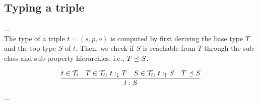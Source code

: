 \documentclass[runningheads]{llncs}
\newcommand{\darr}{\downarrow}
\newcommand{\uarr}{\uparrow}
\newcommand{\T}{{\cal T}}
\newcommand{\memo}[1]{}
\newcommand{\notes}[1]{\noindent\begin{small}-- \emph{#1}\hfill\break\end{small}}
\newcommand{\nnotes}[1]{\indent\begin{small}-- \emph{#1}\hfill\break\end{small}}
\begin{document}
\subsection{Typing a triple}

\memo{
\notes{Why using $\land$ and $\sqcap$ types for typing a triple $t$?}
\nnotes{We would like to check typing of a triple $t\in\T_i$.}
\nnotes{We compute first the ground type $T_g=\land[T_i^{i\in[1,n]}]$ and a stored type $T_s$ of $t$.}
\nnotes{The ground type $T_g$ is computed from the ground types of $t$'s components.}
\nnotes{The subtype relation should hold $T_g\preceq\/T_s$.}

\notes{Two ways of defining semantics.}
\notes{1) enumeration style: stored types are enumerated as alternatives ($\lor$).}
\notes{2) packed together: alternative types are packed in one $\bigvee$ type.}
\notes{One advantage of (1) is that individual glb types can be processed further individually.}
\notes{Advantage of (2) is the higer-level semantics without going in implementation.}

\notes{Stored types have to be related to all join ground types to represent the correct type of a triple.}
\notes{It seems it would be easier to check the pairs one-by-one using (1) in algorithms.}
\notes{In case of using complete types in the phases, types would further have to be processed by $\land,\lor$ rules.}}

... \\

The type of a triple $t=(s,p,o)$ is computed by first deriving the
base type $T$ and the top type $S$ of $t$. Then, we check if $S$ is
reachable from $T$ through the sub-class and sub-property hierarchies,
i.e., $T\preceq\/S$.

\begin{equation}
\label{rul:3-typing}
\dfrac{t\in\T_i\quad T\in\T_t,\, t:_{\darr}T\quad S\in\T_t,\, t:_\uarr\/S\quad T\preceq\/S}
      {t:S}
\end{equation}

\medskip

... \\

\memo{
\medskip
\notes{How to compute $T\preceq\/S$? Refer to position where we have a description.}
\notes{Order the possible derivations, gatherings (groupings) ... of types.}

\notes{Possible diagnoses.}
\notes{Components not related to a top type of a triple?}
\notes{Components related to sub-types of a top type?}
\notes{Above pertain to all components.}}
\end{document}
